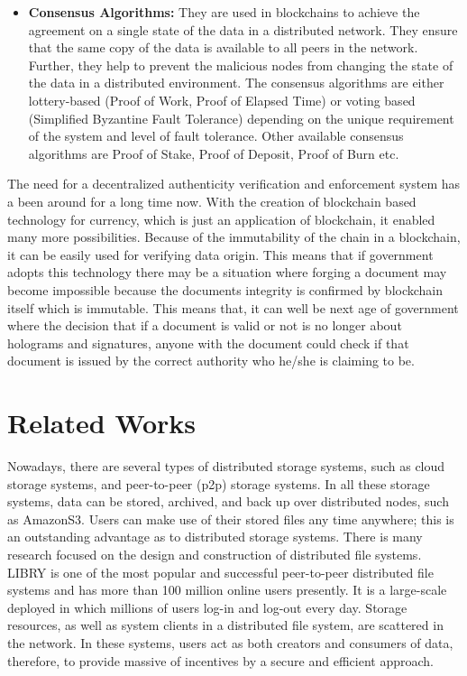 \documentclass[conference]{IEEEtran}
\begin{document}
\begin{itemize}
	\item \textbf{Consensus Algorithms: }They are used in blockchains to achieve the agreement on a single state of the data in       a distributed network. They ensure that the same copy    of the data is available to all peers in the network. Further, they help to prevent the malicious nodes from changing the state of the data in a distributed environment. The consensus algorithms are either lottery-based (Proof of Work, Proof of Elapsed Time) or voting based (Simpliﬁed Byzantine Fault Tolerance) depending on the unique requirement of the system and level of fault tolerance. Other available consensus algorithms are Proof of Stake, Proof of Deposit, Proof of Burn etc. 
\end{itemize}
The need for a decentralized authenticity verification and enforcement system has a been around for a long time now. With the creation of blockchain based technology for currency, which is just an application of blockchain, it enabled many more possibilities. Because of the immutability of the chain in a blockchain, it can be easily used for verifying data origin. This means that if government adopts this technology there may be a situation where forging a document may become impossible because the documents integrity is confirmed by blockchain itself which is immutable. This means that, it can well be next age of government where the decision that if a document is valid or not is no longer about holograms and signatures, anyone with the document could check if that document is issued by the correct authority who he/she is claiming to be.  

\section{Related Works}

Nowadays, there are several types of distributed storage systems, such as cloud storage systems, and peer-to-peer (p2p) storage systems. In all these storage systems, data can be stored, archived, and back up over distributed nodes, such as AmazonS3. Users can make use of their stored files any time anywhere; this is an outstanding advantage as to distributed storage systems. There is many research focused on the design and construction of distributed file systems. LIBRY is one of the most popular and successful peer-to-peer distributed file systems and has more than 100 million online users presently. It is a large-scale deployed in which millions of users log-in and log-out every day. Storage resources, as well as system clients in a distributed file system, are scattered in the network. In these systems, users act as both creators and consumers of data, therefore, to provide massive of incentives by a secure and efficient approach. 
\end{document}

